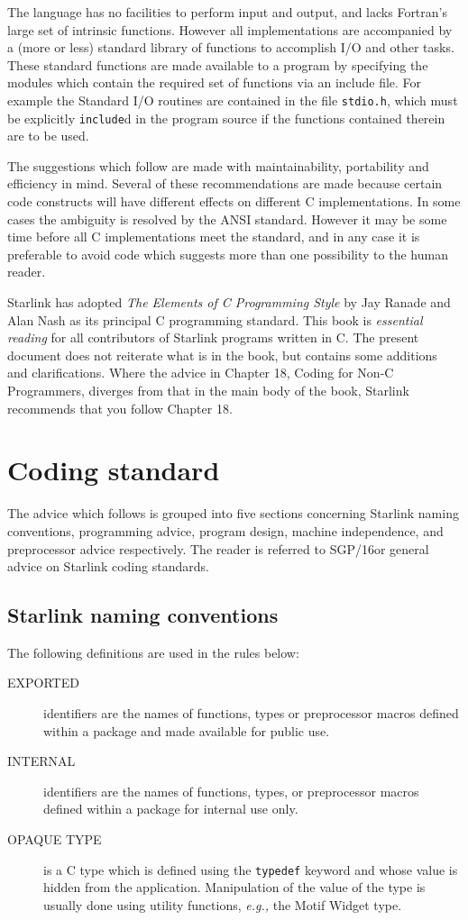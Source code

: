 \documentclass[twoside,11pt]{article}
\newcommand{\xref}[3]{#1}
\begin{document}
The language has no facilities to perform input and output, and lacks
Fortran's large set of intrinsic functions.
However all implementations are accompanied by a (more or less) standard
library of functions to accomplish I/O and other tasks.
These standard functions are made available to  a program by specifying
the modules  which contain the required set of functions via an include file.
For example the Standard I/O routines are contained in the file {\tt stdio.h},
which must be explicitly {\tt include}d in the program source if the functions
contained therein are to be used.

The suggestions which follow are made with maintainability, portability and
efficiency in mind.
Several of these recommendations are made because certain code constructs
will have different effects on different C  implementations.
In some cases the ambiguity is resolved by the ANSI  standard.
However it may be some time before all C implementations meet the standard,
and in any case it is preferable to avoid code which suggests more than one
possibility to the human reader.

Starlink has adopted {\sl The Elements of C Programming Style} by Jay Ranade
and Alan Nash as its principal C programming standard.  This book is
{\it essential reading}\/ for all contributors of Starlink programs written in
C. The present document does not reiterate
what is in the book, but contains some additions and clarifications.  Where
the advice in Chapter 18, Coding for Non-C Programmers, diverges from
that in the main body of the book, Starlink recommends that you follow
Chapter 18.


\section{Coding standard}

The advice which follows is grouped into five sections concerning
Starlink naming conventions, programming advice, program design,
machine independence, and preprocessor advice respectively.  The reader is
referred to \xref{SGP/16}{sgp16} for general advice on Starlink coding standards.

\subsection{Starlink naming conventions}

The following definitions are used in the rules below:

\begin{description}
\item [EXPORTED] identifiers are the names of functions, types or preprocessor
macros defined within a package and made available for public use.
\item [INTERNAL] identifiers are the names of functions, types, or
preprocessor macros defined within a package for internal use only.
\item [OPAQUE TYPE] is a C type which is defined using the \verb~typedef~
keyword and whose
value is hidden from the application.  Manipulation of the value of the type
is usually done using utility functions, {\em e.g.,} the Motif Widget type.
\end{description}
\end{document}
